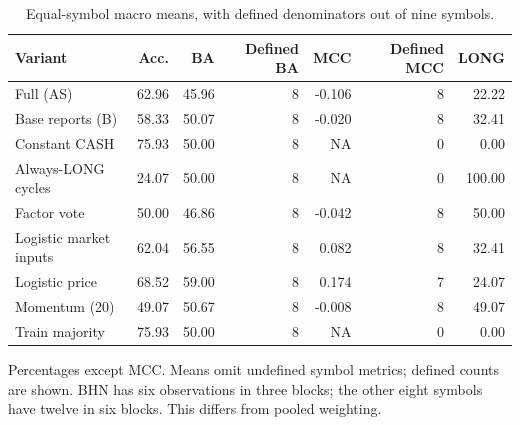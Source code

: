 \begin{table}[htbp]
\centering\small
\caption{Equal-symbol macro means, with defined denominators out of nine symbols.}
\label{tab:r1_common_macro}
\setlength{\tabcolsep}{3.5pt}
\begin{tabular}{lrrrrrr}
\hline
Variant & Acc. & BA & Defined BA & MCC & Defined MCC & LONG \\
\hline
Full (AS) & 62.96 & 45.96 & 8 & -0.106 & 8 & 22.22 \\
Base reports (B) & 58.33 & 50.07 & 8 & -0.020 & 8 & 32.41 \\
Constant CASH & 75.93 & 50.00 & 8 & NA & 0 & 0.00 \\
Always-LONG cycles & 24.07 & 50.00 & 8 & NA & 0 & 100.00 \\
Factor vote & 50.00 & 46.86 & 8 & -0.042 & 8 & 50.00 \\
Logistic market inputs & 62.04 & 56.55 & 8 & 0.082 & 8 & 32.41 \\
Logistic price & 68.52 & 59.00 & 8 & 0.174 & 7 & 24.07 \\
Momentum (20) & 49.07 & 50.67 & 8 & -0.008 & 8 & 49.07 \\
Train majority & 75.93 & 50.00 & 8 & NA & 0 & 0.00 \\
\hline
\end{tabular}
\par\smallskip\footnotesize Percentages except MCC. Means omit undefined symbol metrics; defined counts are shown. BHN has six observations in three blocks; the other eight symbols have twelve in six blocks. This differs from pooled weighting.
\end{table}
